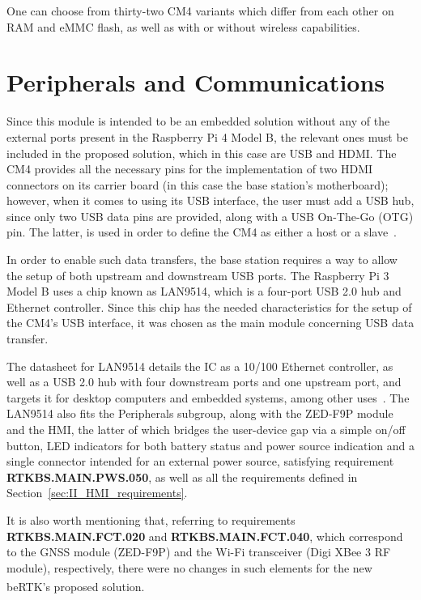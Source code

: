 One can choose from thirty-two CM4 variants which differ from each other on RAM and eMMC flash, as well as with or without wireless capabilities.

\section{Peripherals and Communications}\label{sec:312_Peripherals_Communications}

Since this module is intended to be an embedded solution without any of the external ports present in the Raspberry Pi 4 Model B, the relevant ones must be included in the proposed solution, which in this case are USB and HDMI. The CM4 provides all the necessary pins for the implementation of two HDMI connectors on its carrier board (in this case the base station's motherboard); however, when it comes to using its USB interface, the user must add a USB hub, since only two USB data pins are provided, along with a USB On-The-Go (OTG) pin. The latter, is used in order to define the CM4 as either a host or a slave~\cite{CM4}.


In order to enable such data transfers, the base station requires a way to allow the setup of both upstream and downstream USB ports. The Raspberry Pi 3 Model B uses a chip known as LAN9514, which is a four-port USB 2.0 hub and Ethernet controller. Since this chip has the needed characteristics for the setup of the CM4's USB interface, it was chosen as the main module concerning USB data transfer.

The datasheet for LAN9514 details the IC as a 10/100 Ethernet controller, as well as a USB 2.0 hub with four downstream ports and one upstream port, and targets it for desktop computers and embedded systems, among other uses~\cite{LAN9514}. The LAN9514 also fits the Peripherals subgroup, along with the ZED-F9P module and the HMI, the latter of which bridges the user-device gap via a simple on/off button, LED indicators for both battery status and power source indication and a single connector intended for an external power source, satisfying requirement \textbf{RTKBS.MAIN.PWS.050}, as well as all the requirements defined in Section~\ref{sec:II_HMI_requirements}.

It is also worth mentioning that, referring to requirements \textbf{RTKBS.MAIN.FCT.020} and \textbf{RTKBS.MAIN.FCT.040}, which correspond to the GNSS module (ZED-F9P) and the Wi-Fi transceiver (Digi XBee 3 RF module), respectively, there were no changes in such elements for the new beRTK\textsuperscript{\textregistered}'s proposed solution.

